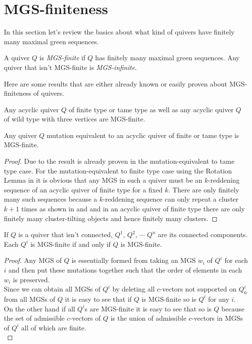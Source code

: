 \section{MGS-finiteness}
\indent In this section let's review the basics about what kind of quivers have finitely many maximal green sequences.
\begin{definition}
A quiver $Q$ is \textit{MGS-finite} if $Q$ has finitely many maximal green sequences. Any quiver that isn't MGS-finite is \textit{MGS-infinite}.
\end{definition}
\indent Here are some results that are either already known or easily proven about MGS-finiteness of quivers.
\begin{theorem}
\cite{BDP13}Any acyclic quiver $Q$ of finite type or tame type as well as any acyclic quiver $Q$ of wild type with three vertices are MGS-finite.
\end{theorem}
\begin{theorem}
Any quiver $Q$ mutation equivalent to an acyclic quiver of finite or tame type is MGS-finite.
\end{theorem}
\begin{proof}
Due to \cite{BHIT15} the result is already proven in the mutation-equivalent to tame type case. For the mutation-equivalent to finite type case using the Rotation Lemma in \cite{BHIT15} it is obvious that any MGS in such a quiver must be an $k$-reddening sequence of an acyclic quiver of finite type for a fixed $k$. There are only finitely many such sequences because a $k$-reddening sequence can only repeat a cluster $k+1$ times as shown in \cite{BHIT15} and \cite{IZ17} and in an acyclic quiver of finite type there are only finitely many cluster-tilting objects and hence finitely many clusters.
\end{proof}
\begin{lemma}
If $Q$ is a quiver that isn't connected, $Q^1$, $Q^2$, $\cdots$ $Q^n$ are its connected components. Each $Q^i$ is MGS-finite if and only if $Q$ is MGS-finite.
\end{lemma}
\begin{proof}
\indent Any MGS of $Q$ is essentially formed from taking an MGS $w_i$ of $Q^i$ for each $i$ and then put these mutations together such that the order of elements in each $w_i$ is preserved.\\ 
\indent Since we can obtain all MGSs of $Q^i$ by deleting all $c$-vectors not supported on $Q^i_0$ from all MGSs of $Q$ it is easy to see that if $Q$ is MGS-finite so is $Q^i$ for any $i$.\\
\indent On the other hand if all $Q^i$s are MGS-finite it is easy to see that so is $Q$ because the set of admissible $c$-vectors of $Q$ is the union of admissible $c$-vectors in MGSs of $Q^i$ all of which are finite.\\
\end{proof}
